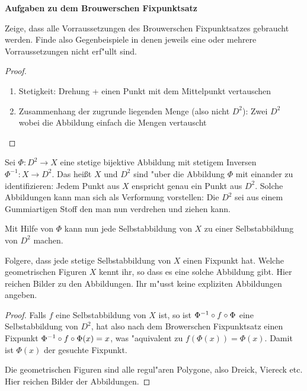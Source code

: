 \documentclass[a4paper,10pt]{article}
\begin{document}
\begin{center}
{\Large \textbf{Aufgaben zu dem Brouwerschen Fixpunktsatz}}
 
\end{center}






\begin{Aufg}
 
 Zeige, dass alle Vorraussetzungen des Brouwerschen Fixpunktsatzes gebraucht werden. Finde also 
 Gegenbeispiele in denen jeweils eine oder mehrere Vorraussetzungen nicht erf"ullt sind.
 
\end{Aufg}

\begin{proof}\leavevmode
 \begin{enumerate}
  \item Stetigkeit: Drehung + einen Punkt mit dem Mittelpunkt vertauschen
  \item Zusammenhang der zugrunde liegenden Menge (also nicht $D^2$): Zwei $D^2$ wobei
  die Abbildung einfach die Mengen vertauscht
 \end{enumerate}

\end{proof}


\begin{Aufg}
 
 Sei $\Phi:D^2 \to X$ eine stetige bijektive Abbildung mit stetigem Inversen $\Phi^{-1}:X \to D^2$.
 Das heißt $X$ und $D^2$ sind "uber die Abbildung $\Phi$ mit einander zu identifizieren:
 Jedem Punkt aus $X$ enspricht genau ein Punkt aus $D^2$.
 Solche Abbildungen kann man sich als Verformung vorstellen: Die $D^2$ sei aus einem Gummiartigen Stoff
 den man nun verdrehen und ziehen kann.
 
 Mit Hilfe von $\Phi$ kann nun jede Selbstabbildung von $X$ zu einer Selbstabbildung von $D^2$ machen.
 
 Folgere, dass  jede stetige Selbstabbildung von $X$ einen Fixpunkt hat.
 Welche geometrischen Figuren $X$ kennt ihr, so dass es eine solche Abbildung gibt. Hier reichen
 Bilder zu den Abbildungen. Ihr m"usst keine expliziten Abbildungen angeben.
 
\end{Aufg}

\begin{proof}
 Falls $f$ eine Selbstabbildung von $X$ ist, so ist $\Phi^{-1} \circ f \circ \Phi$ eine Selbstabbildung
 von $D^2$, hat also nach dem Browerschen Fixpunktsatz einen Fixpunkt
 $  \Phi^{-1} \circ f \circ \Phi(x) = x $, was "aquivalent zu $ f( \Phi (x)) = \Phi(x)$. 
 Damit ist $\Phi(x)$ der gesuchte Fixpunkt.
 
 Die geometrischen Figuren sind alle regul"aren Polygone, also Dreick, Viereck etc. Hier reichen 
 Bilder der Abbildungen.
\end{proof}
\end{document}
